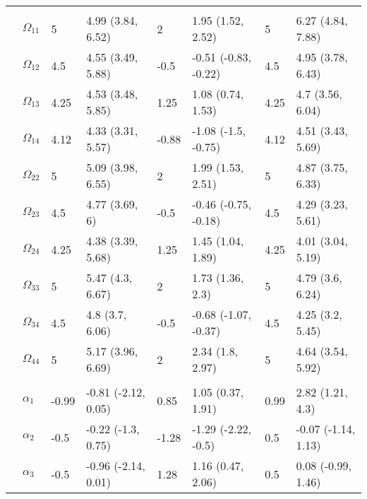 \documentclass[]{article}
\begin{document}
\begin{table}[t]
\begin{tabular}{llllllll}
\addlinespace[0.3em]
\multicolumn{8}{l}{\textbf{ }}\\
\hspace{1em} & $\Omega_{11}$ & 5 & 4.99 (3.84, 6.52) & 2 & 1.95 (1.52, 2.52) & 5 & 6.27 (4.84, 7.88)\\
\hspace{1em} & $\Omega_{12}$ & 4.5 & 4.55 (3.49, 5.88) & -0.5 & -0.51 (-0.83, -0.22) & 4.5 & 4.95 (3.78, 6.43)\\
\hspace{1em} & $\Omega_{13}$ & 4.25 & 4.53 (3.48, 5.85) & 1.25 & 1.08 (0.74, 1.53) & 4.25 & 4.7 (3.56, 6.04)\\
\hspace{1em} & $\Omega_{14}$ & 4.12 & 4.33 (3.31, 5.57) & -0.88 & -1.08 (-1.5, -0.75) & 4.12 & 4.51 (3.43, 5.69)\\
\hspace{1em} & $\Omega_{22}$ & 5 & 5.09 (3.98, 6.55) & 2 & 1.99 (1.53, 2.51) & 5 & 4.87 (3.75, 6.33)\\
\hspace{1em} & $\Omega_{23}$ & 4.5 & 4.77 (3.69, 6) & -0.5 & -0.46 (-0.75, -0.18) & 4.5 & 4.29 (3.23, 5.61)\\
\hspace{1em} & $\Omega_{24}$ & 4.25 & 4.38 (3.39, 5.68) & 1.25 & 1.45 (1.04, 1.89) & 4.25 & 4.01 (3.04, 5.19)\\
\hspace{1em} & $\Omega_{33}$ & 5 & 5.47 (4.3, 6.67) & 2 & 1.73 (1.36, 2.3) & 5 & 4.79 (3.6, 6.24)\\
\hspace{1em} & $\Omega_{34}$ & 4.5 & 4.8 (3.7, 6.06) & -0.5 & -0.68 (-1.07, -0.37) & 4.5 & 4.25 (3.2, 5.45)\\
\hspace{1em} & $\Omega_{44}$ & 5 & 5.17 (3.96, 6.69) & 2 & 2.34 (1.8, 2.97) & 5 & 4.64 (3.54, 5.92)\\
\addlinespace[0.3em]
\multicolumn{8}{l}{\textbf{ }}\\
\hspace{1em} & $\alpha_{1}$ & -0.99 & -0.81 (-2.12, 0.05) & 0.85 & 1.05 (0.37, 1.91) & 0.99 & 2.82 (1.21, 4.3)\\
\hspace{1em} & $\alpha_{2}$ & -0.5 & -0.22 (-1.3, 0.75) & -1.28 & -1.29 (-2.22, -0.5) & 0.5 & -0.07 (-1.14, 1.13)\\
\hspace{1em} & $\alpha_{3}$ & -0.5 & -0.96 (-2.14, 0.01) & 1.28 & 1.16 (0.47, 2.06) & 0.5 & 0.08 (-0.99, 1.46)\\

\end{tabular}
\end{table}
\end{document}

